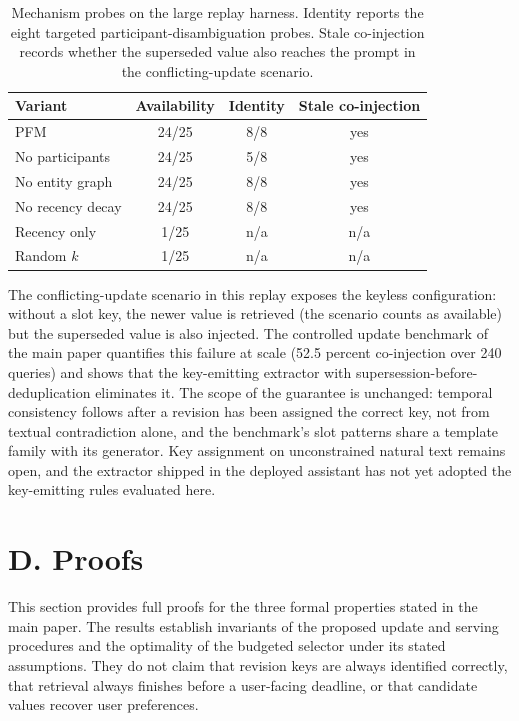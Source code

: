 \documentclass[letterpaper]{article} %
\begin{document}
\begin{table}[t]
\centering
\small
\begin{tabular}{@{}lccc@{}}
\toprule
Variant & Availability & Identity & Stale co-injection \\
\midrule
PFM & 24/25 & 8/8 & yes \\
No participants & 24/25 & 5/8 & yes \\
No entity graph & 24/25 & 8/8 & yes \\
No recency decay & 24/25 & 8/8 & yes \\
Recency only & 1/25 & n/a & n/a \\
Random $k$ & 1/25 & n/a & n/a \\
\bottomrule
\end{tabular}
\caption{Mechanism probes on the large replay harness. Identity reports the eight targeted participant-disambiguation probes. Stale co-injection records whether the superseded value also reaches the prompt in the conflicting-update scenario.}
\label{tab:ablation}
\end{table}

The conflicting-update scenario in this replay exposes the keyless configuration: without a slot key, the newer value is retrieved (the scenario counts as available) but the superseded value is also injected. The controlled update benchmark of the main paper quantifies this failure at scale (52.5 percent co-injection over 240 queries) and shows that the key-emitting extractor with supersession-before-deduplication eliminates it. The scope of the guarantee is unchanged: temporal consistency follows after a revision has been assigned the correct key, not from textual contradiction alone, and the benchmark's slot patterns share a template family with its generator. Key assignment on unconstrained natural text remains open, and the extractor shipped in the deployed assistant has not yet adopted the key-emitting rules evaluated here.

\section{D. Proofs}

This section provides full proofs for the three formal properties stated in the main paper. The results establish invariants of the proposed update and serving procedures and the optimality of the budgeted selector under its stated assumptions. They do not claim that revision keys are always identified correctly, that retrieval always finishes before a user-facing deadline, or that candidate values recover user preferences.
\end{document}
